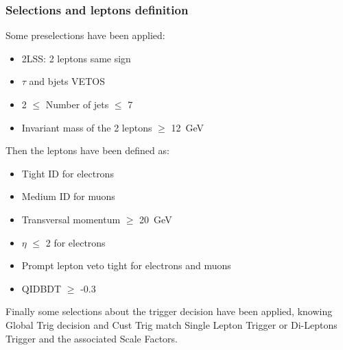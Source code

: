 \subsubsection{Selections and leptons definition}
Some preselections have been applied: 
\begin{itemize}
    \item 2LSS: 2 leptons same sign
    \item $\tau$ and bjets VETOS
    \item 2 $\leq$ Number of jets $\leq$ 7
    \item Invariant mass of the 2 leptons $\geq$ 12~GeV
\end{itemize}
Then the leptons have been defined as: 
\begin{itemize}
    \item Tight ID for electrons
    \item Medium ID for muons
    \item Transversal momentum $\geq$ 20~GeV
    \item $\eta$ $\leq$ 2 for electrons
    \item Prompt lepton veto tight for electrons and muons
    \item QIDBDT $\geq$ -0.3
\end{itemize}
Finally some selections about the trigger decision have been applied, knowing Global Trig decision and Cust Trig match Single Lepton Trigger or Di-Leptons Trigger and the associated Scale Factors. 

